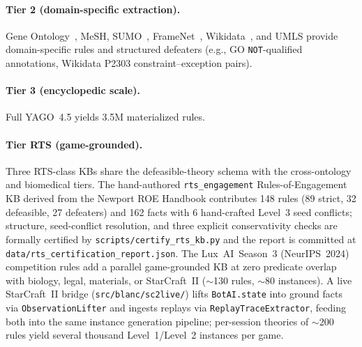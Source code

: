 \documentclass{article}
\theoremstyle{definition}
\begin{document}
\paragraph{Tier 2 (domain-specific extraction).}
Gene Ontology~\cite{ashburner2000go}, MeSH, SUMO~\cite{niles2001sumo}, FrameNet~\cite{baker1998framenet}, Wikidata~\cite{vrandecic2014wikidata}, and UMLS provide domain-specific rules and structured defeaters (e.g., GO \texttt{NOT}-qualified annotations, Wikidata P2303 constraint--exception pairs).

\paragraph{Tier 3 (encyclopedic scale).}
Full YAGO~4.5 yields 3.5M materialized rules.

\paragraph{Tier RTS (game-grounded).}
Three RTS-class KBs share the defeasible-theory schema with the cross-ontology and biomedical tiers. The hand-authored \texttt{rts\_engagement} Rules-of-Engagement KB derived from the Newport ROE Handbook contributes 148 rules (89 strict, 32 defeasible, 27 defeaters) and 162 facts with 6 hand-crafted Level~3 seed conflicts; structure, seed-conflict resolution, and three explicit conservativity checks are formally certified by \texttt{scripts/certify\_rts\_kb.py} and the report is committed at \texttt{data/rts\_certification\_report.json}. The Lux~AI~Season~3 (NeurIPS~2024) competition rules add a parallel game-grounded KB at zero predicate overlap with biology, legal, materials, or StarCraft~II ($\sim$130 rules, $\sim$80 instances). A live StarCraft~II bridge (\texttt{src/blanc/sc2live/}) lifts \texttt{BotAI.state} into ground facts via \texttt{ObservationLifter} and ingests replays via \texttt{ReplayTraceExtractor}, feeding both into the same instance generation pipeline; per-session theories of $\sim$200 rules yield several thousand Level~1/Level~2 instances per game.
\end{document}
